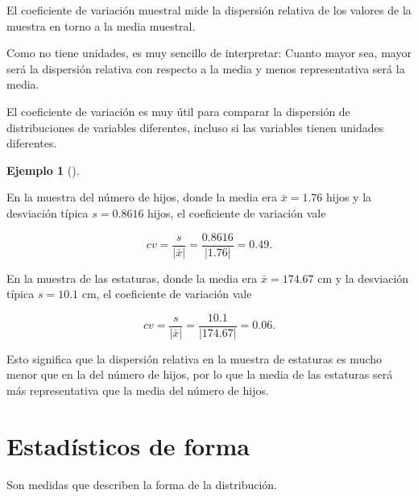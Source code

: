 \documentclass[
  spanish,
  a4paper,
]{scrreport}
\theoremstyle{plain}
\theoremstyle{definition}
\newtheorem{example}{Ejemplo}[chapter]
\theoremstyle{definition}
\theoremstyle{remark}
\begin{document}
\begin{tcolorbox}[enhanced jigsaw, arc=.35mm, bottomrule=.15mm, bottomtitle=1mm, breakable, colback=white, colbacktitle=quarto-callout-tip-color!10!white, colframe=quarto-callout-tip-color-frame, coltitle=black, left=2mm, leftrule=.75mm, opacityback=0, opacitybacktitle=0.6, rightrule=.15mm, title=\textcolor{quarto-callout-tip-color}{\faLightbulb}\hspace{0.5em}{Tip}, titlerule=0mm, toprule=.15mm, toptitle=1mm]

El coeficiente de variación muestral mide la dispersión relativa de los
valores de la muestra en torno a la media muestral.

Como no tiene unidades, es muy sencillo de interpretar: Cuanto mayor
sea, mayor será la dispersión relativa con respecto a la media y menos
representativa será la media.

\end{tcolorbox}

El coeficiente de variación es muy útil para comparar la dispersión de
distribuciones de variables diferentes, incluso si las variables tienen
unidades diferentes.

\begin{example}[]\protect\hypertarget{exm-coeficiente-variacion}{}\label{exm-coeficiente-variacion}

En la muestra del número de hijos, donde la media era \(\bar x=1.76\)
hijos y la desviación típica \(s=0.8616\) hijos, el coeficiente de
variación vale

\[cv = \frac{s}{|\bar x|} = \frac{0.8616}{|1.76|} = 0.49.\]

En la muestra de las estaturas, donde la media era \(\bar x=174.67\) cm
y la desviación típica \(s=10.1\) cm, el coeficiente de variación vale

\[cv = \frac{s}{|\bar x|} = \frac{10.1}{|174.67|} = 0.06.\]

Esto significa que la dispersión relativa en la muestra de estaturas es
mucho menor que en la del número de hijos, por lo que la media de las
estaturas será más representativa que la media del número de hijos.

\end{example}

\section{Estadísticos de forma}\label{estaduxedsticos-de-forma}

Son medidas que describen la forma de la distribución.
\end{document}
